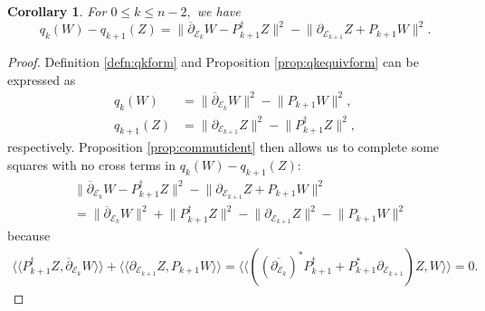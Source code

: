 \documentclass[11pt]{article}
\newtheorem{cor}[theorem]{Corollary}
\theoremstyle{definition}
\newcommand{\llangle}{\langle\!\langle}
\newcommand{\rrangle}{\rangle\!\rangle}
\numberwithin{equation}{section}
\begin{document}
\begin{cor}\label{cor:qdiff}
	For $0 \leq k \leq n-2,$ we have
	\begin{equation}\label{eq:qkdiffid}
		q_k(W) - q_{k+1}(Z)= \lVert \overline{\partial}_{\mathcal{E}_k} W - P_{k+1}^\dagger Z \rVert^2 - \lVert \partial_{\mathcal{E}_{k+1}} Z +  P_{k+1} W \rVert^2.
	\end{equation}
\end{cor}

\begin{proof}
	Definition \ref{defn:qkform} and Proposition \ref{prop:qkequivform} can be expressed as
	\begin{equation*}
		\begin{aligned}
			q_k(W)     & = \lVert \overline{\partial}_{\mathcal{E}_k} W \rVert^2 - \lVert P_{k+1} W \rVert^2,  \\
			q_{k+1}(Z) & = \lVert \partial_{\mathcal{E}_{k+1}} Z \rVert^2 - \lVert P_{k+1}^\dagger Z \rVert^2, 
		\end{aligned}
	\end{equation*}
	respectively. Proposition \ref{prop:commutident} then allows us to complete some squares with no cross terms in $q_k(W) - q_{k+1}(Z)$:
	\begin{equation*}
		\begin{aligned}
			  & \lVert \overline{\partial}_{\mathcal{E}_k} W - P_{k+1}^\dagger Z \rVert^2 - \lVert \partial_{\mathcal{E}_{k+1}} Z +  P_{k+1} W \rVert^2                                  \\
			  & = \lVert \overline{\partial}_{\mathcal{E}_k} W \rVert^2 + \lVert P_{k+1}^\dagger Z \rVert^2 - \lVert \partial_{\mathcal{E}_{k+1}} Z \rVert^2 - \lVert P_{k+1} W \rVert^2 
		\end{aligned}
	\end{equation*}
	because
	\begin{equation*}
		\begin{aligned}
			\llangle P_{k+1}^\dagger Z, \overline{\partial}_{\mathcal{E}_k} W \rrangle + \llangle \partial_{\mathcal{E}_{k+1}} Z, P_{k+1} W \rrangle = \llangle \left( (\overline{\partial_{\mathcal{E}_k}})^* P_{k+1}^\dagger + P_{k+1}^* \partial_{\mathcal{E}_{k+1}} \right) Z, W \rrangle = 0. 
		\end{aligned}
	\end{equation*}
\end{proof}
\end{document}
